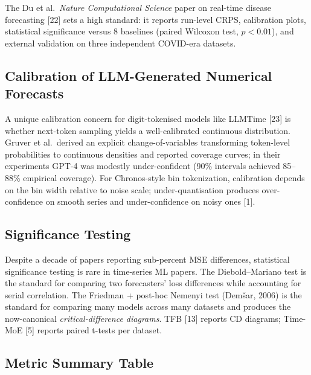 \documentclass{article}
\begin{document}
The Du et al.~\emph{Nature Computational Science} paper on real-time disease forecasting {[}22{]} sets a high standard: it reports run-level CRPS, calibration plots, statistical significance versus 8 baselines (paired Wilcoxon test, \(p < 0.01\)), and external validation on three independent COVID-era datasets.

\subsection{Calibration of LLM-Generated Numerical Forecasts}\label{calibration-of-llm-generated-numerical-forecasts}

A unique calibration concern for digit-tokenised models like LLMTime {[}23{]} is whether next-token sampling yields a well-calibrated continuous distribution. Gruver et al.~derived an explicit change-of-variables transforming token-level probabilities to continuous densities and reported coverage curves; in their experiments GPT-4 was modestly under-confident (90\% intervals achieved 85--88\% empirical coverage). For Chronos-style bin tokenization, calibration depends on the bin width relative to noise scale; under-quantisation produces over-confidence on smooth series and under-confidence on noisy ones {[}1{]}.

\subsection{Significance Testing}\label{significance-testing}

Despite a decade of papers reporting sub-percent MSE differences, statistical significance testing is rare in time-series ML papers. The Diebold--Mariano test is the standard for comparing two forecasters' loss differences while accounting for serial correlation. The Friedman + post-hoc Nemenyi test (Demšar, 2006) is the standard for comparing many models across many datasets and produces the now-canonical \emph{critical-difference diagrams}. TFB {[}13{]} reports CD diagrams; Time-MoE {[}5{]} reports paired t-tests per dataset.

\subsection{Metric Summary Table}\label{metric-summary-table}
\end{document}
